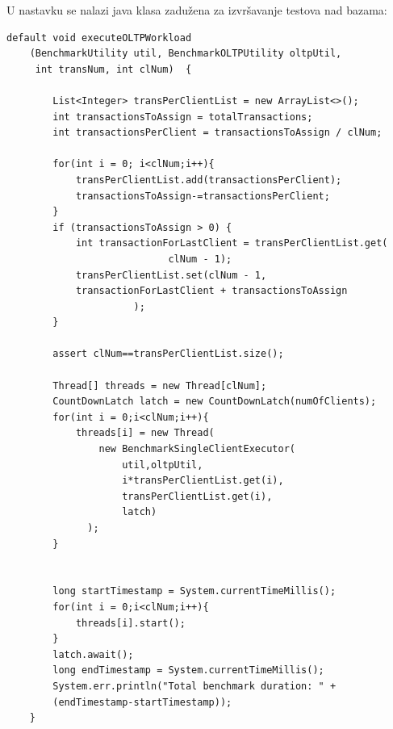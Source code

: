 \documentclass[12pt,oneside]{memoir}
\begin{document}
U nastavku se nalazi java klasa zadužena za izvršavanje testova nad bazama:


\begin{lstlisting}[title={OLTPBenchmarkExecutor.java},captionpos=t]
default void executeOLTPWorkload
    (BenchmarkUtility util, BenchmarkOLTPUtility oltpUtil, 
     int transNum, int clNum)  {

        List<Integer> transPerClientList = new ArrayList<>();
        int transactionsToAssign = totalTransactions;
        int transactionsPerClient = transactionsToAssign / clNum;

        for(int i = 0; i<clNum;i++){
            transPerClientList.add(transactionsPerClient);
            transactionsToAssign-=transactionsPerClient;
        }
        if (transactionsToAssign > 0) {
            int transactionForLastClient = transPerClientList.get(
							clNum - 1);
            transPerClientList.set(clNum - 1, 
			transactionForLastClient + transactionsToAssign
					  );
        }

        assert clNum==transPerClientList.size();

        Thread[] threads = new Thread[clNum];
        CountDownLatch latch = new CountDownLatch(numOfClients);
        for(int i = 0;i<clNum;i++){
            threads[i] = new Thread(
				new BenchmarkSingleClientExecutor(
					util,oltpUtil,
					i*transPerClientList.get(i),
					transPerClientList.get(i),
					latch)
			  );
        }


        long startTimestamp = System.currentTimeMillis();
        for(int i = 0;i<clNum;i++){
            threads[i].start();
        }
        latch.await();
        long endTimestamp = System.currentTimeMillis();
        System.err.println("Total benchmark duration: " + 
		(endTimestamp-startTimestamp));
    }
\end{lstlisting}
\end{document}
